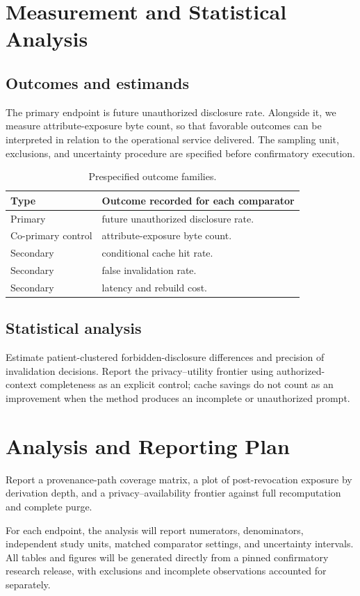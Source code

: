\documentclass[11pt,a4paper]{article}
\begin{document}
\section{Measurement and Statistical Analysis}
\subsection{Outcomes and estimands}
The primary endpoint is future unauthorized disclosure rate. Alongside it, we measure attribute-exposure byte count, so that favorable outcomes can be interpreted in relation to the operational service delivered. The sampling unit, exclusions, and uncertainty procedure are specified before confirmatory execution.
\begin{table}[ht]
\centering\footnotesize
\caption{Prespecified outcome families.}
\begin{tabularx}{\linewidth}{@{}lX@{}}\toprule
Type & Outcome recorded for each comparator \\ \midrule
Primary & future unauthorized disclosure rate. \\ 
Co-primary control & attribute-exposure byte count. \\ 
Secondary & conditional cache hit rate. \\ 
Secondary & false invalidation rate. \\ 
Secondary & latency and rebuild cost. \\ 
\bottomrule\end{tabularx}
\end{table}

\subsection{Statistical analysis}
Estimate patient-clustered forbidden-disclosure differences and precision of invalidation decisions. Report the privacy–utility frontier using authorized-context completeness as an explicit control; cache savings do not count as an improvement when the method produces an incomplete or unauthorized prompt.

\section{Analysis and Reporting Plan}
Report a provenance-path coverage matrix, a plot of post-revocation exposure by derivation depth, and a privacy–availability frontier against full recomputation and complete purge.

For each endpoint, the analysis will report numerators, denominators, independent study units, matched comparator settings, and uncertainty intervals. All tables and figures will be generated directly from a pinned confirmatory research release, with exclusions and incomplete observations accounted for separately.
\end{document}
